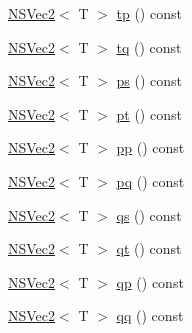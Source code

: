 \begin{DoxyCompactItemize}
\item 
\hyperlink{structNSVec2}{N\-S\-Vec2}$<$ T $>$ \hyperlink{structNSVec4_a5755bc41420a54d6f36bd21f6fc32329}{tp} () const 
\item 
\hyperlink{structNSVec2}{N\-S\-Vec2}$<$ T $>$ \hyperlink{structNSVec4_aa30efedc1f88008c69af84949038a072}{tq} () const 
\item 
\hyperlink{structNSVec2}{N\-S\-Vec2}$<$ T $>$ \hyperlink{structNSVec4_aed769811590745e07612adb0e2708e09}{ps} () const 
\item 
\hyperlink{structNSVec2}{N\-S\-Vec2}$<$ T $>$ \hyperlink{structNSVec4_ae543316d069dba120412796aa75da140}{pt} () const 
\item 
\hyperlink{structNSVec2}{N\-S\-Vec2}$<$ T $>$ \hyperlink{structNSVec4_a28f84e19975c26ca34e47523c8fc6c6e}{pp} () const 
\item 
\hyperlink{structNSVec2}{N\-S\-Vec2}$<$ T $>$ \hyperlink{structNSVec4_a12c83f9d6f622ba35aca16453bb18cab}{pq} () const 
\item 
\hyperlink{structNSVec2}{N\-S\-Vec2}$<$ T $>$ \hyperlink{structNSVec4_aa418e751cba0e83f6999c2c8fc5aa08d}{qs} () const 
\item 
\hyperlink{structNSVec2}{N\-S\-Vec2}$<$ T $>$ \hyperlink{structNSVec4_a872a1bf3d00af59849a07bd0e17dd047}{qt} () const 
\item 
\hyperlink{structNSVec2}{N\-S\-Vec2}$<$ T $>$ \hyperlink{structNSVec4_a5bc25366e8f447cdc053e6d78839b9c3}{qp} () const 
\item 
\hyperlink{structNSVec2}{N\-S\-Vec2}$<$ T $>$ \hyperlink{structNSVec4_a39c4d45a5aafc6fe3f1196cc64b682ab}{qq} () const 
\end{DoxyCompactItemize}
